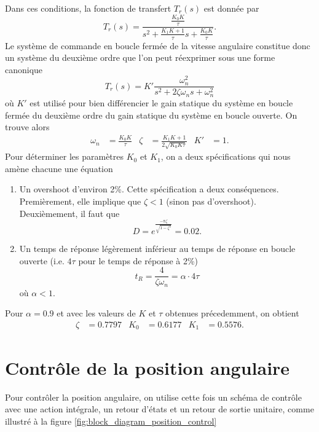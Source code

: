 \documentclass[frenchb, paper=a4, fontsize=11pt]{scrartcl}
\numberwithin{equation}{section}					%
\numberwithin{figure}{section}					%
\numberwithin{table}{section}						%
\begin{document}
Dans ces conditions, la fonction de transfert $T_r(s)$ est donnée
par
\begin{equation}
	T_r(s) = \frac{\frac{K_0K}{\tau}}{s^2 +\frac{K_1K+1}{\tau}s + \frac{K_0K}{\tau}}.
\end{equation}
Le système de commande en boucle fermée de la vitesse angulaire
constitue donc un système du deuxième ordre que l'on peut réexprimer
sous une forme canonique
\begin{equation}
	T_r(s) = K'\frac{\omega_n^2}{s^2 + 2\zeta\omega_n s+ \omega_n^2}
\end{equation}
où $K'$ est utilisé pour bien différencier le gain statique du système en
boucle fermée du deuxième ordre du gain statique du système en boucle
ouverte. On trouve alors
\begin{align}
	\omega_n & = \frac{K_0K}{\tau} & \zeta & = \frac{K_1K + 1}{2\sqrt{K_0K\tau}}
	& K' & = 1.
\end{align}
Pour déterminer les paramètres $K_0$ et $K_1$, on a deux spécifications
qui nous amène chacune une équation
\begin{enumerate}
	\item Un overshoot d'environ 2\%. Cette spécification a deux conséquences.
	Premièrement, elle implique que $\zeta < 1$ (sinon pas d'overshoot). Deuxièmement,
	il faut que
	\begin{equation}
		D = e^{\frac{-\pi\zeta}{\sqrt{1-\zeta^2}}} = 0.02.
	\end{equation}
	\item Un temps de réponse légèrement inférieur au temps de réponse en boucle
	ouverte (i.e. $4\tau$ pour le temps de réponse à 2\%)
	\begin{equation}
		t_R = \frac{4}{\zeta\omega_n} = \alpha \cdot 4\tau
	\end{equation}
	où $\alpha < 1$.
\end{enumerate}
Pour $\alpha = 0.9$ et avec les valeurs de $K$ et $\tau$ obtenues précedemment,
on obtient
\begin{align}
	\zeta & = 0.7797 & K_0 & = 0.6177 & K_1 & = 0.5576.
\end{align}


\section{Contrôle de la position angulaire}
Pour contrôler la position angulaire, on utilise cette fois un schéma de contrôle
avec une action intégrale, un retour d'états et un retour de sortie unitaire,
comme illustré à la figure \ref{fig:block_diagram_position_control}
\end{document}
